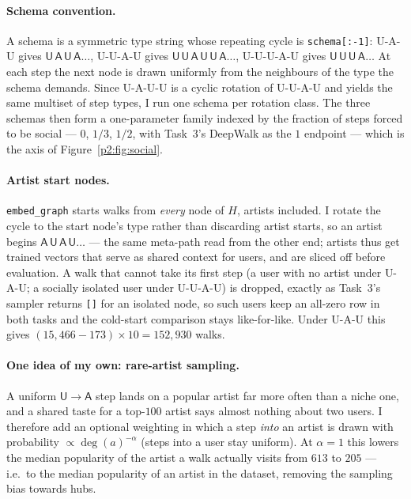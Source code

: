 \paragraph{Schema convention.}
A schema is a symmetric type string whose repeating cycle is \texttt{schema[:-1]}:
\textsf{U-A-U} gives $\mathsf{U\,A\,U\,A}\dots$, \textsf{U-U-A-U} gives
$\mathsf{U\,U\,A\,U\,U\,A}\dots$, \textsf{U-U-U-A-U} gives $\mathsf{U\,U\,U\,A}\dots$
At each step the next node is drawn uniformly from the neighbours of the type the schema
demands.  Since \textsf{U-A-U-U} is a cyclic rotation of \textsf{U-U-A-U} and yields the
same multiset of step types, I run one schema per rotation class.  The three schemas then
form a one-parameter family indexed by the fraction of steps forced to be social ---
$0$, $1/3$, $1/2$, with Task~3's DeepWalk as the $1$ endpoint --- which is the axis of
Figure~\ref{p2:fig:social}.

\paragraph{Artist start nodes.}
\texttt{embed\_graph} starts walks from \emph{every} node of $H$, artists included.
I rotate the cycle to the start node's type rather than discarding artist starts, so an
artist begins $\mathsf{A\,U\,A\,U}\dots$ --- the same meta-path read from the other end;
artists thus get trained vectors that serve as shared context for users, and are sliced
off before evaluation.  A walk that cannot take its first step (a user with no artist
under \textsf{U-A-U}; a socially isolated user under \textsf{U-U-A-U}) is dropped, exactly
as Task~3's sampler returns \texttt{[]} for an isolated node, so such users keep an
all-zero row in both tasks and the cold-start comparison stays like-for-like.  Under
\textsf{U-A-U} this gives $(15{,}466-173)\times 10 = 152{,}930$ walks.

\paragraph{One idea of my own: rare-artist sampling.}
A uniform $\mathsf{U}\to\mathsf{A}$ step lands on a popular artist far more often than a
niche one, and a shared taste for a top-$100$ artist says almost nothing about two users.
I therefore add an optional weighting in which a step \emph{into} an artist is drawn with
probability $\propto \deg(a)^{-\alpha}$ (steps into a user stay uniform).  At $\alpha{=}1$
this lowers the median popularity of the artist a walk actually visits from $613$ to
$205$ --- i.e.\ to the median popularity of an artist in the dataset, removing the
sampling bias towards hubs.


